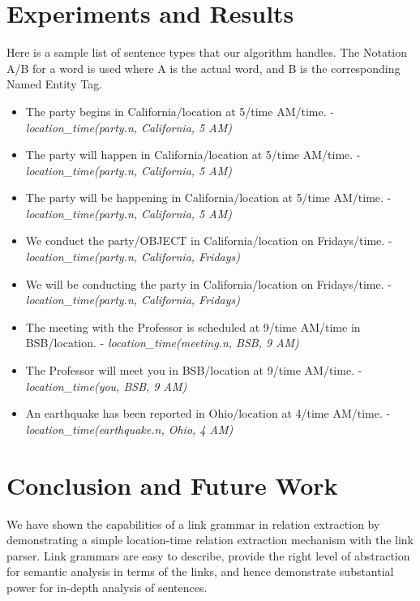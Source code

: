 \documentclass[runningheads,a4paper,11pt]{llncs}
\begin{document}
  \section{Experiments and Results}
 Here is a sample list of sentence types that our algorithm handles. The Notation A/B for a word is used where A is the actual word, and B is the 
 corresponding Named Entity Tag.
 \begin{itemize}
  \item The party begins in California/location at 5/time AM/time. - \textit{location\_time(party.n, California, 5 AM)}
 \item The party will happen in California/location at 5/time AM/time. - \textit{location\_time(party.n, California, 5 AM)}
 \item The party will be happening in California/location at 5/time AM/time. - \textit{location\_time(party.n, California, 5 AM)}
 \item We conduct the party/OBJECT in California/location on Fridays/time. - \textit{location\_time(party.n, California, Fridays)}
 \item We will be conducting the party in California/location on Fridays/time. - \textit{location\_time(party.n, California, Fridays)}
  \item The meeting with the Professor is scheduled at 9/time AM/time in BSB/location. - \textit{location\_time(meeting.n, BSB, 9 AM)}
  \item The Professor will meet you in BSB/location at 9/time AM/time. - \textit{location\_time(you, BSB, 9 AM)}
  \item An earthquake has been reported in Ohio/location at 4/time AM/time. - \textit{location\_time(earthquake.n, Ohio, 4 AM)}

 \end{itemize}
 

 
 
\section{Conclusion and Future Work}
We have shown the capabilities of a link grammar in relation extraction by demonstrating a simple location-time relation extraction mechanism with the link parser.
Link grammars are easy to describe, provide the right level of abstraction for semantic analysis in terms of the links, and hence demonstrate substantial 
power for in-depth analysis of sentences. 
\end{document}
